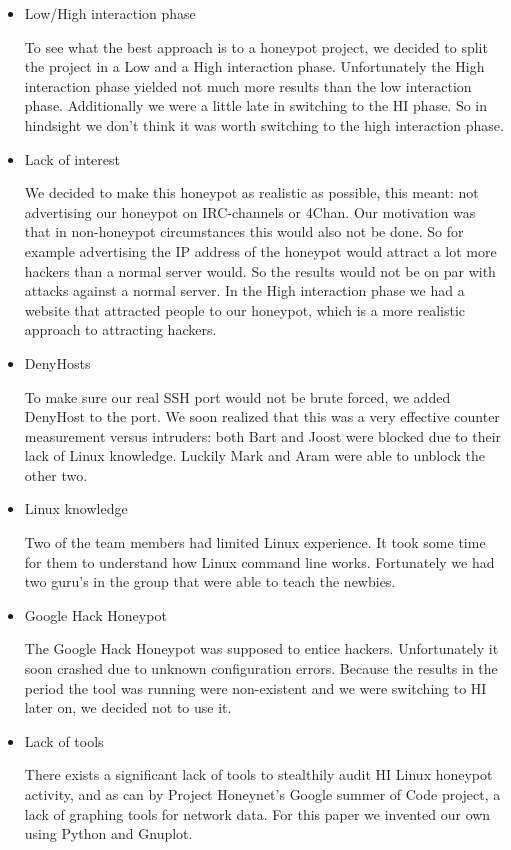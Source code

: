 \documentclass[11pt]{article}
\begin{document}
\begin{itemize}
\item Low/High interaction phase

To see what the best approach is to a honeypot project, we decided to split the project in a Low and a High interaction phase. Unfortunately the High interaction phase yielded not much more results than the low interaction phase. Additionally we were a little late in switching to the HI phase. So in hindsight we don't think it was worth switching to the high interaction phase.

\item Lack of interest

We decided to make this honeypot as realistic as possible, this meant: not advertising our honeypot on IRC-channels or 4Chan. Our motivation was that in non-honeypot circumstances this would also not be done. So for example advertising the IP address of the honeypot would attract a lot more hackers than a normal server would. So the results would not be on par with attacks against a normal server. In the High interaction phase we had a website that attracted people to our honeypot, which is a more realistic approach to attracting hackers.

\item DenyHosts

To make sure our real SSH port would not be brute forced, we added DenyHost to the port. We soon realized that this was a very effective counter measurement versus intruders: both Bart and Joost were blocked due to their lack of Linux knowledge. Luckily Mark and Aram were able to unblock the other two.

\item Linux knowledge

Two of the team members had limited Linux experience. It took some time for them to understand how Linux command line works. Fortunately we had two guru's in the group that were able to teach the newbies.

\item Google Hack Honeypot

The Google Hack Honeypot was supposed to entice hackers. Unfortunately it soon crashed due to unknown configuration errors. Because the results in the period the tool was running were non-existent and we were switching to HI later on, we decided not to use it. 

\item Lack of tools

There exists a significant lack of tools to stealthily audit HI Linux honeypot activity, and as can by Project Honeynet's Google summer of Code project, a lack of graphing tools for network data.
For this paper we invented our own using Python and Gnuplot.

\end{itemize}



\end{document}
